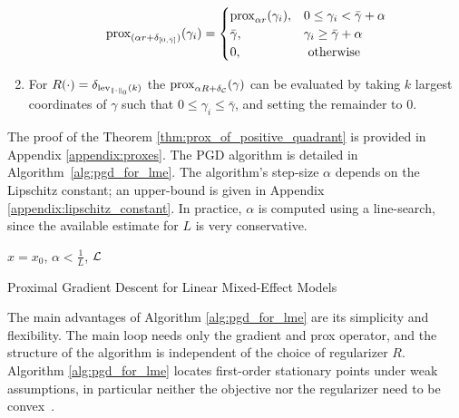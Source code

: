 \begin{theorem}
\begin{enumerate}
\[
{\mathrm{prox}}_{(\alpha r + \delta_{[0,{\bar{\gamma}}]})}(\gamma_i) 
    = \begin{cases} 
        {\mathrm{prox}}_{\alpha r}(\gamma_i), & 0 \leq \gamma_i < \bar\gamma + \alpha \\
        \bar\gamma, & \gamma_i \geq \bar\gamma + \alpha \\
        0, & \text{ otherwise} \end{cases}
\]
    \item For $R(\cdot) = \delta_{{\mathrm{lev}_{\left\Vert \cdot\right\Vert_0}(k)}}$  %
    the ${\mathrm{prox}}_{\alpha R + \delta_{\mathcal{C}}}(\gamma)$ can be evaluated by taking $k$ largest coordinates of $\gamma$ such that $0 \leq \gamma_i \leq \bar\gamma$, and setting the 
    remainder to $0$.
    \end{enumerate}
\end{theorem}
The proof of the Theorem \ref{thm:prox_of_positive_quadrant} is provided in Appendix \ref{appendix:proxes}. 
The  PGD algorithm is detailed in Algorithm~\ref{alg:pgd_for_lme}.
{The algorithm's step-size $\alpha$ depends on the Lipschitz constant; an upper-bound is given in Appendix \ref{appendix:lipschitz_constant}. In practice, $\alpha$ is computed using a line-search, since the available estimate for $L$ is very conservative.}

\smallskip

\begin{algorithm}[H]
\SetAlgoLined
$x = x_0$, $\alpha < \frac{1}{L}$, $\operatorname{\mathcal{L}}$ \\
 \caption{\label{alg:pgd_for_lme}Proximal Gradient Descent for Linear Mixed-Effect Models}
\end{algorithm}
\medskip

\noindent

The main advantages of Algorithm \ref{alg:pgd_for_lme} are its simplicity and flexibility.
The main loop needs only the gradient and prox operator, and the structure of the algorithm is independent of the choice of regularizer $R$.
Algorithm \ref{alg:pgd_for_lme} locates first-order stationary points
under weak assumptions, in particular neither the objective nor the regularizer need to be convex~\citep{AB17,attouch2013convergence}. 

